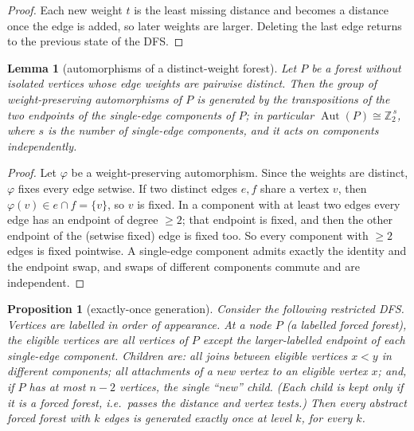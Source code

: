 \documentclass[11pt,a4paper]{article}
\theoremstyle{plain}
\newtheorem{lemma}[theorem]{Lemma}
\newtheorem{proposition}[theorem]{Proposition}
\theoremstyle{remark}
\newcommand{\Aut}{\operatorname{Aut}}
\newcommand{\Z}{\mathbb{Z}}
\begin{document}
\begin{proof}
Each new weight $t$ is the least missing distance and becomes a distance once
the edge is added, so later weights are larger.  Deleting the last edge returns
to the previous state of the DFS.
\end{proof}

\begin{lemma}[automorphisms of a distinct-weight forest]\label{lem:aut}
Let $P$ be a forest without isolated vertices whose edge weights are pairwise
distinct.  Then the group of weight-preserving automorphisms of $P$ is generated
by the transpositions of the two endpoints of the single-edge components of $P$;
in particular $\Aut(P)\cong\Z_2^{\,s}$, where $s$ is the number of single-edge
components, and it acts on components independently.
\end{lemma}

\begin{proof}
Let $\varphi$ be a weight-preserving automorphism.  Since the weights are
distinct, $\varphi$ fixes every edge setwise.  If two distinct edges $e,f$ share
a vertex $v$, then $\varphi(v)\in e\cap f=\{v\}$, so $v$ is fixed.  In a
component with at least two edges every edge has an endpoint of degree $\ge 2$;
that endpoint is fixed, and then the other endpoint of the (setwise fixed) edge
is fixed too.  So every component with $\ge 2$ edges is fixed pointwise.  A
single-edge component admits exactly the identity and the endpoint swap, and
swaps of different components commute and are independent.
\end{proof}

\begin{proposition}[exactly-once generation]\label{prop:once}
Consider the following restricted DFS.  Vertices are labelled in order of
appearance.  At a node $P$ (a labelled forced forest), the \emph{eligible}
vertices are all vertices of $P$ except the larger-labelled endpoint of each
single-edge component.  Children are: all joins between eligible vertices $x<y$
in different components; all attachments of a new vertex to an eligible vertex
$x$; and, if $P$ has at most $n-2$ vertices, the single ``new'' child.  (Each
child is kept only if it is a forced forest, i.e.\ passes the distance and
vertex tests.)  Then every abstract forced forest with $k$ edges is generated
exactly once at level $k$, for every $k$.
\end{proposition}
\end{document}
